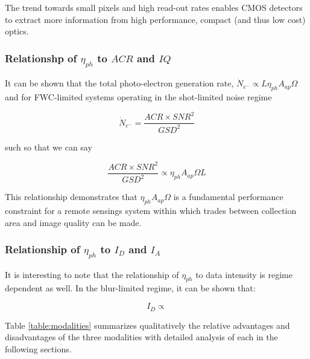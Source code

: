 \documentclass[10pt,journal]{IEEEtran}  %
\begin{document}
\begin{observation}
The trend towards small pixels and high read-out rates enables CMOS detectors to extract more information from high performance, compact (and thus low cost) optics.
\end{observation}

\subsubsection{Relationshp of $\eta_{ph}$ to $ACR$ and $IQ$}

It can be shown that the total photo-electron generation rate, $\dot{N}_{e^-} \propto L\eta_{ph}A_{ap}\Omega$ and for FWC-limited systems operating in the shot-limited noise regime

\begin{equation}
    \dot{N}_{e^-} = \frac{ACR \times SNR^2}{GSD^2}
\end{equation}

such so that we can say

\begin{equation}
    \frac{ACR \times SNR^2}{GSD^2} \propto \eta_{ph} A_{ap}\Omega L
\end{equation}

This relationship demonstrates that $\eta_{ph}A_{ap}\Omega$ is a fundamental performance constraint for a remote sensings system within which trades between collection area and image quality can be made.

\subsubsection{Relationship of $\eta_{ph}$ to $I_{D}$ and $I_A$}

It is interesting to note that the relationship of $\eta_{ph}$ to data intensity is regime dependent as well.  In the blur-limited regime, it can be shown that:

\begin{equation}
    I_D \propto 
\end{equation}

Table \ref{table:modalities} summarizes qualitatively the relative advantages and disadvantages of the three modalities with detailed analysis of each in the following sections.
\end{document}
